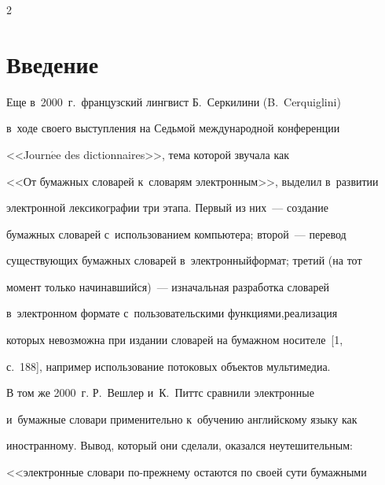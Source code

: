 \thispagestyle{headings}





\begin{multicols}{2}





\label{st\stat}


  


\section{Введение}





  Еще в~2000~г.\ французский лингвист Б.~Серкилини (B.~Cerquiglini) 


в~ходе своего выступления на Седьмой международной конференции 


<<Journ$\acute{\mbox{e}}$e des dictionnaires>>, тема которой звучала как 


<<От бумажных словарей к~словарям электронным>>, выделил в~развитии 


электронной лексикографии три этапа. Первый из них~--- создание 


бумажных словарей с~использованием компьютера; второй~--- перевод 


существующих бумажных словарей в~электронный\linebreak формат; третий (на тот 


момент только начинавшийся)~--- изначальная разработка словарей 


в~электронном формате с~пользовательскими функциями,\linebreak реализация 


которых невозможна при издании словарей на бумажном носителе~[1, 


с.~188], например использование потоковых объектов мультимедиа.


  


  В том же 2000~г. Р.~Вешлер и~К.~Питтс сравнили электронные 


и~бумажные словари применительно к~обучению английскому языку как 


иностранному. Вывод, который они сделали, оказался неутешительным: 


<<электронные словари по-преж\-не\-му остаются по своей сути бумажными 



\end{multicols}
